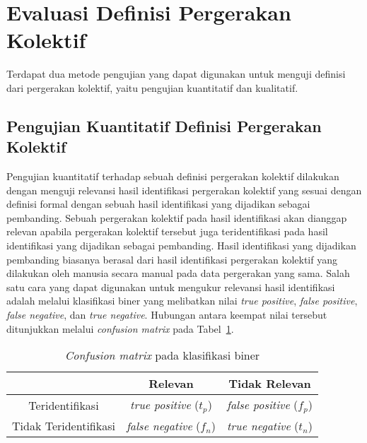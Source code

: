 \vspace{10pt}

\section{Evaluasi Definisi Pergerakan Kolektif}
\label{sec:eval-theory}

Terdapat dua metode pengujian yang dapat digunakan untuk menguji definisi dari pergerakan kolektif, yaitu pengujian kuantitatif dan kualitatif.

\subsection{Pengujian Kuantitatif Definisi Pergerakan Kolektif}
\label{subsec:quantitative-theory}

Pengujian kuantitatif terhadap sebuah definisi pergerakan kolektif dilakukan dengan menguji relevansi hasil identifikasi pergerakan kolektif yang sesuai dengan definisi formal dengan sebuah hasil identifikasi yang dijadikan sebagai pembanding. Sebuah pergerakan kolektif pada hasil identifikasi akan dianggap relevan apabila pergerakan kolektif tersebut juga teridentifikasi pada hasil identifikasi yang dijadikan sebagai pembanding. Hasil identifikasi yang dijadikan pembanding biasanya berasal dari hasil identifikasi pergerakan kolektif yang dilakukan oleh manusia  secara manual pada data pergerakan yang sama. Salah satu cara yang dapat digunakan untuk mengukur relevansi hasil identifikasi adalah melalui klasifikasi biner yang melibatkan nilai \textit{true positive}, \textit{false positive}, \textit{false negative}, dan \textit{true negative}. Hubungan antara keempat nilai tersebut ditunjukkan melalui \textit{confusion matrix} pada Tabel~\ref{bab2:confusion}.

\begin{table}[t]
    \centering
    \caption{\textit{Confusion matrix} pada klasifikasi biner}
    \begin{tabular}{|c|c|c|}
        \hline
         & Relevan & Tidak Relevan  \\ \hline
        Teridentifikasi & \textit{true positive} ($t_p$) & \textit{false positive} ($f_p$) \\ \hline
        Tidak Teridentifikasi & \textit{false negative} ($f_n$) & \textit{true negative} ($t_n$) \\
        \hline
    \end{tabular}
    \label{bab2:confusion}
\end{table}

